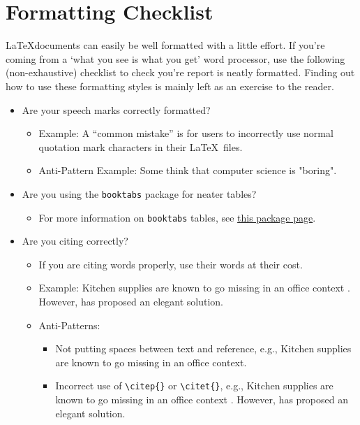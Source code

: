 \chapter{Formatting Checklist}

\LaTeX documents can easily be well formatted with a little effort. If you're coming from a `what you see is what you get' word processor, use the following (non-exhaustive) checklist to check you're report is neatly formatted. Finding out how to use these formatting styles is mainly left as an exercise to the reader.

\begin{itemize}
    \item Are your speech marks correctly formatted?  
    \begin{itemize}
        \item Example: A ``common mistake'' is for users to incorrectly use normal quotation mark characters in their \LaTeX\ files.
        \item Anti-Pattern Example: Some think that computer science is "boring".
    \end{itemize}

    \item Are you using the \texttt{booktabs} package for neater tables?  
    \begin{itemize}
        \item For more information on \texttt{booktabs} tables, see \href{https://nhigham.com/2019/11/19/better-latex-tables-with-booktabs/}{this package page}.
    \end{itemize}

    \item Are you citing correctly?  
    \begin{itemize}
        \item If you are citing words properly, use their words at their cost.
        \item Example: Kitchen supplies are known to go missing in an office context \citep{CaseOfDisappearingTeaspoons}. However,  \citet{TeaspoonSolutionProposal} has proposed an elegant solution.
        \item Anti-Patterns:
        \begin{itemize}
            \item Not putting spaces between text and reference, e.g., Kitchen supplies are known to go missing in an office context\citep{CaseOfDisappearingTeaspoons}.
            \item Incorrect use of \texttt{\textbackslash citep\{\}} or \texttt{\textbackslash citet\{\}}, e.g., Kitchen supplies are known to go missing in an office context \citet{CaseOfDisappearingTeaspoons}. However, \citep{TeaspoonSolutionProposal} has proposed an elegant solution.
        \end{itemize}
    \end{itemize}


\end{itemize}
